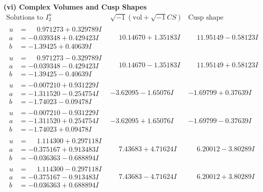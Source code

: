 \documentclass[1p]{elsarticle_modified}
\theoremstyle{definition}
\newcommand{\I}{\sqrt{-1}}
\begin{document}
\newpage\flushleft \textbf{(vi) Complex Volumes and Cusp Shapes}
$$\begin{array}{c|c|c}  
\text{Solutions to }I^u_{2}& \I (\text{vol} + \sqrt{-1}CS) & \text{Cusp shape}\\
 \hline 
\begin{aligned}
u &= \phantom{-}0.971273 + 0.329789 I \\
a &= -0.039348 + 0.429423 I \\
b &= -1.39425 + 0.40639 I\end{aligned}
 & \phantom{-}10.14670 + 1.35183 I & \phantom{-}11.95149 - 0.58123 I \\ \hline\begin{aligned}
u &= \phantom{-}0.971273 - 0.329789 I \\
a &= -0.039348 - 0.429423 I \\
b &= -1.39425 - 0.40639 I\end{aligned}
 & \phantom{-}10.14670 - 1.35183 I & \phantom{-}11.95149 + 0.58123 I \\ \hline\begin{aligned}
u &= -0.007210 + 0.931229 I \\
a &= -1.311520 - 0.254754 I \\
b &= -1.74023 - 0.09478 I\end{aligned}
 & -3.62095 - 1.65076 I & -1.69799 + 0.37639 I \\ \hline\begin{aligned}
u &= -0.007210 - 0.931229 I \\
a &= -1.311520 + 0.254754 I \\
b &= -1.74023 + 0.09478 I\end{aligned}
 & -3.62095 + 1.65076 I & -1.69799 - 0.37639 I \\ \hline\begin{aligned}
u &= \phantom{-}1.114300 + 0.297118 I \\
a &= -0.375167 + 0.913483 I \\
b &= -0.036363 - 0.688894 I\end{aligned}
 & \phantom{-}7.43683 + 4.71624 I & \phantom{-}6.20012 - 3.80289 I \\ \hline\begin{aligned}
u &= \phantom{-}1.114300 - 0.297118 I \\
a &= -0.375167 - 0.913483 I \\
b &= -0.036363 + 0.688894 I\end{aligned}
 & \phantom{-}7.43683 - 4.71624 I & \phantom{-}6.20012 + 3.80289 I \\ \hline\begin{aligned}

\end{aligned}
\end{array}$$
\end{document}
